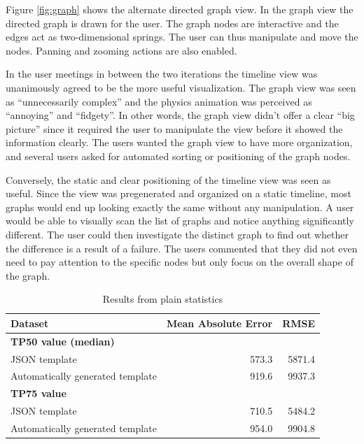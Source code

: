 Figure \ref{fig:graph} shows the alternate directed graph view. In the graph view the directed graph is drawn for the user. The graph nodes are interactive and the edges act as two-dimensional springs.
The user can thus manipulate and move the nodes. Panning and zooming actions are also enabled.

In the user meetings in between the two iterations the timeline view was unanimously agreed to be the more useful visualization. 
The graph view was seen as ``unnecessarily complex'' and the physics animation was perceived as ``annoying'' and ``fidgety''. 
In other words, the graph view didn't offer a clear ``big picture'' since it required the user to manipulate the view before it showed the information clearly. 
The users wanted the graph view to have more organization, and several users asked for automated sorting or positioning of the graph nodes.

Conversely, the static and clear positioning of the timeline view was seen as useful.
Since the view was pregenerated and organized on a static timeline, most graphs would end up looking exactly the same without any manipulation.
A user would be able to visually scan the list of graphs and notice anything significantly different.
The user could then investigate the distinct graph to find out whether the difference is a result of a failure.
The users commented that they did not even need to pay attention to the specific nodes but only focus on the overall shape of the graph.

\begin{table}[htb]
\begin{center}
\begin{tabularx}{\linewidth}{| X | r | r |}
\hline
Dataset & Mean Absolute Error & RMSE \\
\hline
\textbf{TP50 value (median)} &  & \\
JSON template                       & 573.3 & 5871.4 \\
Automatically generated template    & 919.6 & 9937.3 \\
\hline
\textbf{TP75 value} &  & \\
JSON template                       & 710.5 & 5484.2 \\
Automatically generated template    & 954.0 & 9904.8 \\
\hline
\end{tabularx}
\end{center}
\caption{Results from plain statistics}
\label{tab:statresults}
\end{table}

